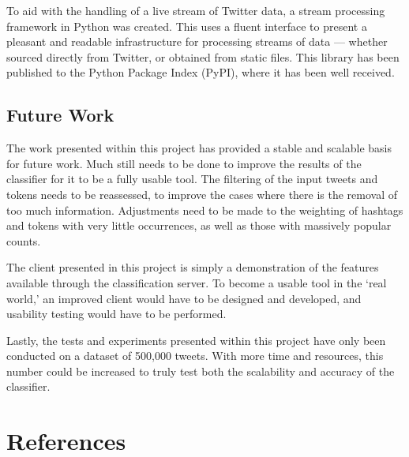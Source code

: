 \documentclass[11pt,a4paper]{report}
\begin{document}
To aid with the handling of a live stream of Twitter data, a stream processing framework in Python was created. This uses a fluent interface to present a pleasant and readable infrastructure for processing streams of data --- whether sourced directly from Twitter, or obtained from static files. This library has been published to the Python Package Index (PyPI), where it has been well received.

\section{Future Work}
The work presented within this project has provided a stable and scalable basis for future work. Much still needs to be done to improve the results of the classifier for it to be a fully usable tool. The filtering of the input tweets and tokens needs to be reassessed, to improve the cases where there is the removal of too much information. Adjustments need to be made to the weighting of hashtags and tokens with very little occurrences, as well as those with massively popular counts.

The client presented in this project is simply a demonstration of the features available through the classification server. To become a usable tool in the `real world,' an improved client would have to be designed and developed, and usability testing would have to be performed.

Lastly, the tests and experiments presented within this project have only been conducted on a dataset of 500,000 tweets. With more time and resources, this number could be increased to truly test both the scalability and accuracy of the classifier.

\pagebreak

\chapter*{References}
\printbibliography[heading=none]
\end{document}
